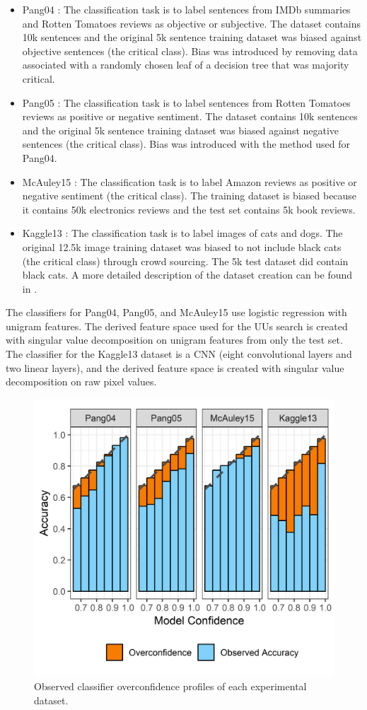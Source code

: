 \documentclass[letterpaper]{article} %
\begin{document}
\begin{itemize}
\item Pang04 \citep{pang2004}: The classification task is to label sentences from IMDb summaries and Rotten Tomatoes reviews as objective or subjective.  The dataset contains 10k sentences and the original 5k sentence training dataset was biased against objective sentences (the critical class). Bias was introduced by removing data associated with a randomly chosen leaf of a decision tree that was majority critical.  
\item Pang05 \citep{pang2005}: The classification task is to label sentences from Rotten Tomatoes reviews as positive or negative sentiment.  The dataset contains 10k sentences and the original 5k sentence training dataset was biased against negative sentences (the critical class). Bias was introduced with the method used for Pang04.  
\item McAuley15 \citep{mcauley2015}: The classification task is to label Amazon reviews as positive or negative sentiment (the critical class). The training dataset is biased because it contains 50k electronics reviews and the test set contains 5k book reviews.
\item Kaggle13 \citep{kaggle2013}: The classification task is to label images of cats and dogs.  The original 12.5k image training dataset was biased to not include black cats (the critical class) through crowd sourcing. The 5k test dataset did contain black cats. A more detailed description of the dataset creation can be found in \cite{Bansal2018}.
\end{itemize}

The classifiers for Pang04, Pang05, and McAuley15 use logistic regression with unigram features. The derived feature space used for the UUs search is created with singular value decomposition on unigram features from only the test set. The classifier for the Kaggle13 dataset is a CNN (eight convolutional layers and two linear layers), and the derived feature space is created with singular value decomposition on raw pixel values.

\begin{figure}[hbtp]
  \includegraphics[width=.49\textwidth]{overconfidence_2.png}
  \caption{Observed classifier overconfidence profiles of each experimental dataset.}
  \label{fig:overconf}
\end{figure}
\end{document}

